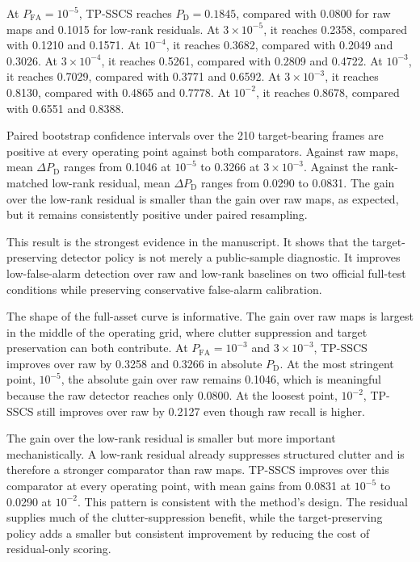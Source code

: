 \documentclass[journal]{IEEEtran}
\begin{document}
At $P_{\mathrm{FA}}=10^{-5}$, TP-SSCS reaches $P_{\mathrm{D}}=0.1845$, compared with 0.0800 for raw maps and 0.1015 for low-rank residuals. At $3 \times 10^{-5}$, it reaches 0.2358, compared with 0.1210 and 0.1571. At $10^{-4}$, it reaches 0.3682, compared with 0.2049 and 0.3026. At $3 \times 10^{-4}$, it reaches 0.5261, compared with 0.2809 and 0.4722. At $10^{-3}$, it reaches 0.7029, compared with 0.3771 and 0.6592. At $3 \times 10^{-3}$, it reaches 0.8130, compared with 0.4865 and 0.7778. At $10^{-2}$, it reaches 0.8678, compared with 0.6551 and 0.8388.

Paired bootstrap confidence intervals over the 210 target-bearing frames are positive at every operating point against both comparators. Against raw maps, mean $\Delta P_{\mathrm{D}}$ ranges from 0.1046 at $10^{-5}$ to 0.3266 at $3 \times 10^{-3}$. Against the rank-matched low-rank residual, mean $\Delta P_{\mathrm{D}}$ ranges from 0.0290 to 0.0831. The gain over the low-rank residual is smaller than the gain over raw maps, as expected, but it remains consistently positive under paired resampling.

This result is the strongest evidence in the manuscript. It shows that the target-preserving detector policy is not merely a public-sample diagnostic. It improves low-false-alarm detection over raw and low-rank baselines on two official full-test conditions while preserving conservative false-alarm calibration.

The shape of the full-asset curve is informative. The gain over raw maps is largest in the middle of the operating grid, where clutter suppression and target preservation can both contribute. At $P_{\mathrm{FA}}=10^{-3}$ and $3\times10^{-3}$, TP-SSCS improves over raw by 0.3258 and 0.3266 in absolute $P_{\mathrm{D}}$. At the most stringent point, $10^{-5}$, the absolute gain over raw remains 0.1046, which is meaningful because the raw detector reaches only 0.0800. At the loosest point, $10^{-2}$, TP-SSCS still improves over raw by 0.2127 even though raw recall is higher.

The gain over the low-rank residual is smaller but more important mechanistically. A low-rank residual already suppresses structured clutter and is therefore a stronger comparator than raw maps. TP-SSCS improves over this comparator at every operating point, with mean gains from 0.0831 at $10^{-5}$ to 0.0290 at $10^{-2}$. This pattern is consistent with the method's design. The residual supplies much of the clutter-suppression benefit, while the target-preserving policy adds a smaller but consistent improvement by reducing the cost of residual-only scoring.
\end{document}
